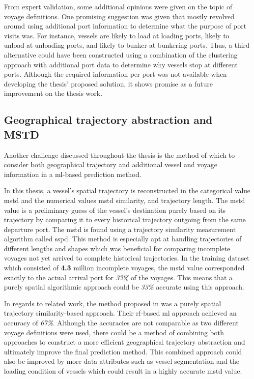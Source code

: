 From expert validation, some additional opinions were given on the topic of voyage definitions. One promising suggestion was given that mostly revolved around using additional port information to determine what the purpose of port visits was. For instance, vessels are likely to load at loading ports, likely to unload at unloading ports, and likely to bunker at bunkering ports. Thus, a third alternative could have been constructed using a combination of the clustering approach with additional port data to determine why vessels stop at different ports. Although the required information per port was not available when developing the thesis' proposed solution, it shows promise as a future improvement on the thesis work.

\subsection{Geographical trajectory abstraction and MSTD}

Another challenge discussed throughout the thesis is the method of which to consider both geographical trajectory and additional vessel and voyage information in a \acrfull{ml}-based prediction method.

In this thesis, a vessel's spatial trajectory is reconstructed in the categorical value \acrfull{mstd} and the numerical values \acrshort{mstd} similarity, and trajectory length. The \acrshort{mstd} value is a preliminary guess of the vessel's destination purely based on its trajectory by comparing it to every historical trajectory outgoing from the same departure port. The \acrshort{mstd} is found using a trajectory similarity measurement algorithm called \acrfull{sspd}. This method is especially apt at handling trajectories of different lengths and shapes which was beneficial for comparing incomplete voyages not yet arrived to complete historical trajectories. In the training dataset which consisted of \textbf{4.3} million incomplete voyages, the \acrshort{mstd} value corresponded exactly to the actual arrival port for \textit{33\%} of the voyages. This means that a purely spatial algorithmic approach could be \textit{33\%} accurate using this approach.

In regards to related work, the method proposed \cite{Zhang2020AISApproach} in was a purely spatial trajectory similarity-based approach. Their \acrfull{rf}-based \acrshort{ml} approach achieved an accuracy of \textit{67\%}. Although the accuracies are not comparable as two different voyage definitions were used, there could be a method of combining both approaches to construct a more efficient geographical trajectory abstraction and ultimately improve the final prediction method. This combined approach could also be improved by more data attributes such as vessel segmentation and the loading condition of vessels which could result in a highly accurate \acrshort{mstd} value.

